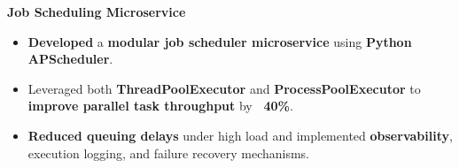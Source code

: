 \documentclass[11 pt]{article}
\begin{document}
\noindent\textbf{Job Scheduling Microservice}
\begin{itemize}
  \item \textbf{Developed} a \textbf{modular job scheduler microservice} using \textbf{Python APScheduler}.
  \item Leveraged both \textbf{ThreadPoolExecutor} and \textbf{ProcessPoolExecutor} to \textbf{improve parallel task throughput} by \textbf{~40\%}.
  \item \textbf{Reduced queuing delays} under high load and implemented \textbf{observability}, execution logging, and failure recovery mechanisms.
\end{itemize}
\end{document}

